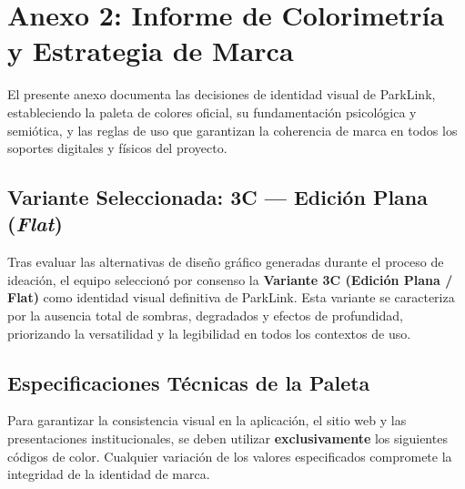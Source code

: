 \newpage
\section{Anexo 2: Informe de Colorimetría y Estrategia de Marca}\label{anexo:colorimetria}

El presente anexo documenta las decisiones de identidad visual de ParkLink, estableciendo la paleta de colores oficial, su fundamentación psicológica y semiótica, y las reglas de uso que garantizan la coherencia de marca en todos los soportes digitales y físicos del proyecto.

\subsection{Variante Seleccionada: 3C — Edición Plana (\textit{Flat})}

Tras evaluar las alternativas de diseño gráfico generadas durante el proceso de ideación, el equipo seleccionó por consenso la \textbf{Variante 3C (Edición Plana / Flat)} como identidad visual definitiva de ParkLink. Esta variante se caracteriza por la ausencia total de sombras, degradados y efectos de profundidad, priorizando la versatilidad y la legibilidad en todos los contextos de uso.

\subsection{Especificaciones Técnicas de la Paleta}

Para garantizar la consistencia visual en la aplicación, el sitio web y las presentaciones institucionales, se deben utilizar \textbf{exclusivamente} los siguientes códigos de color. Cualquier variación de los valores especificados compromete la integridad de la identidad de marca.

\vspace{0.4cm}

